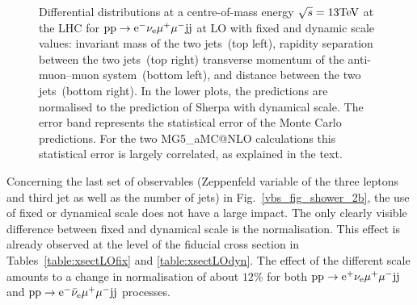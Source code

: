 \documentclass[11pt]{cernrep}
\makeatletter
\newcommand{\MGaMC}{M\protect\scalebox{0.8}{AD}G\protect\scalebox{0.8}{RAPH}5\_aMC@NLO\xspace}
\makeatother
\begin{document}
\begin{figure}[htbp]
\begin{center}
\caption{Differential distributions at a centre-of-mass energy $\sqrt{s}=13{\rm TeV}$ at the LHC for ${\rm p} {\rm p}
  \to {\rm e}^-  \nu_{\rm e}  \mu^+ \mu^- {\rm j} {\rm j}$ at LO with fixed and dynamic scale values:  
                invariant mass of the two jets~(top left),
                rapidity separation between the two jets~(top right)
                transverse momentum of the anti-muon--muon system~(bottom left), and
                distance between the two jets~(bottom right).
                In the lower plots, the predictions are normalised to the prediction of {\sc Sherpa} with
                dynamical scale. The error band represents
                the statistical error of the Monte Carlo predictions. For the two \MGaMC
                calculations this statistical error is largely correlated, as explained in the text.}
\label{vbs_fig_shower_2a}
\end{center}
\end{figure}

Concerning the last set of observables (Zeppenfeld variable of the three leptons and third jet as well as the number of jets) in Fig.~\ref{vbs_fig_shower_2b}, the use of fixed or dynamical scale does not have a large impact.
The only clearly visible difference between fixed and dynamical scale is the normalisation.
This effect is already observed at the level of the fiducial cross section in Tables~\ref{table:xsectLOfix} and \ref{table:xsectLOdyn}.
The effect of the different scale amounts to a change in normalisation of about $12\%$ for both ${\rm p}{\rm p}\to{\rm e}^+\nu_{\rm e}\mu^+\mu^-{\rm j}{\rm j}$ and ${\rm p}{\rm p}\to{\rm e}^-\bar\nu_{\rm e}\mu^+\mu^-{\rm j}{\rm j}$ processes.
\end{document}
